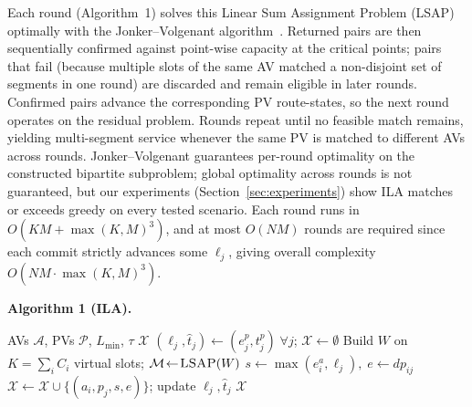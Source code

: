 \documentclass[sigconf]{acmart}
\begin{document}
Each round (Algorithm~1) solves this Linear Sum Assignment Problem (LSAP) optimally with the Jonker--Volgenant algorithm~\cite{scipy2020,kuhn1955hungarian}. Returned pairs are then sequentially confirmed against point-wise capacity at the critical points; pairs that fail (because multiple slots of the same AV matched a non-disjoint set of segments in one round) are discarded and remain eligible in later rounds. Confirmed pairs advance the corresponding PV route-states, so the next round operates on the residual problem. Rounds repeat until no feasible match remains, yielding multi-segment service whenever the same PV is matched to different AVs across rounds. Jonker--Volgenant guarantees per-round optimality on the constructed bipartite subproblem; global optimality across rounds is not guaranteed, but our experiments (Section~\ref{sec:experiments}) show ILA matches or exceeds greedy on every tested scenario. Each round runs in $O(KM + \max(K,M)^3)$, and at most $O(NM)$ rounds are required since each commit strictly advances some $\ell_j$, giving overall complexity $O(NM\!\cdot\!\max(K,M)^3)$.

\noindent\textbf{Algorithm 1 (ILA).}
\begin{algorithmic}[1]
\Require AVs $\mathcal{A}$, PVs $\mathcal{P}$, $L_{\min}$, $\tau$
\Ensure $\mathcal{X}$
\State $(\ell_j,\hat{t}_j)\!\leftarrow\!(e^p_j,t^p_j)\;\forall j$;\; $\mathcal{X}\!\leftarrow\!\emptyset$
\Repeat
  \State Build $W$ on $K{=}\sum_i C_i$ virtual slots; $\mathcal{M}\!\leftarrow\!\textsc{LSAP}(W)$
    \State $s\!\leftarrow\!\max(e^a_i,\ell_j),\; e\!\leftarrow\!dp_{ij}$
      \State $\mathcal{X}\!\leftarrow\!\mathcal{X}\cup\{(a_i,p_j,s,e)\}$;\; update $\ell_j,\hat{t}_j$
    \EndIf
  \EndFor
{}
\State \Return $\mathcal{X}$
\end{algorithmic}
\end{document}
